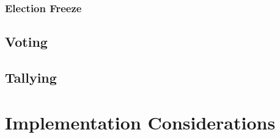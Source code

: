 \documentclass[runningheads,a4paper]{llncs}
\begin{document}
\subsubsection{Election Freeze}

\subsection{Voting}

\subsection{Tallying}

\section{Implementation Considerations}





\end{document}
